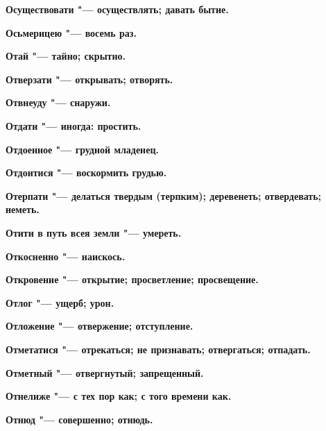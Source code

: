 \begin{mymulticols}{2}
\bfseries Осуществовати\normalfont{} "--- осуществлять; давать бытие. 




\bfseries Осьмерицею\normalfont{} "--- восемь раз. 




\bfseries Отай\normalfont{} "--- тайно; скрытно. 




\bfseries Отверзати\normalfont{} "--- открывать; отворять. 




\bfseries Отвнеуду\normalfont{} "--- снаружи. 




\bfseries Отдати\normalfont{} "--- иногда: простить. 




\bfseries Отдоенное\normalfont{} "--- грудной младенец. 




\bfseries Отдоитися\normalfont{} "--- воскормить грудью. 




\bfseries Отерпати\normalfont{} "--- делаться твердым (терпким); деревенеть; отвердевать; неметь. 




\bfseries Отити в путь всея земли\normalfont{} "--- умереть. 




\bfseries Откосненно\normalfont{} "--- наискось. 




\bfseries Откровение\normalfont{} "--- открытие; просветление; просвещение. 




\bfseries Отлог\normalfont{} "--- ущерб; урон. 




\bfseries Отложение\normalfont{} "--- отвержение; отступление. 




\bfseries Отметатися\normalfont{} "--- отрекаться; не признавать; отвергаться; отпадать. 




\bfseries Отметный\normalfont{} "--- отвергнутый; запрещенный. 




\bfseries Отнелиже\normalfont{} "--- с тех пор как; с того времени как. 




\bfseries Отнюд\normalfont{} "--- совершенно; отнюдь. 





\end{mymulticols}
